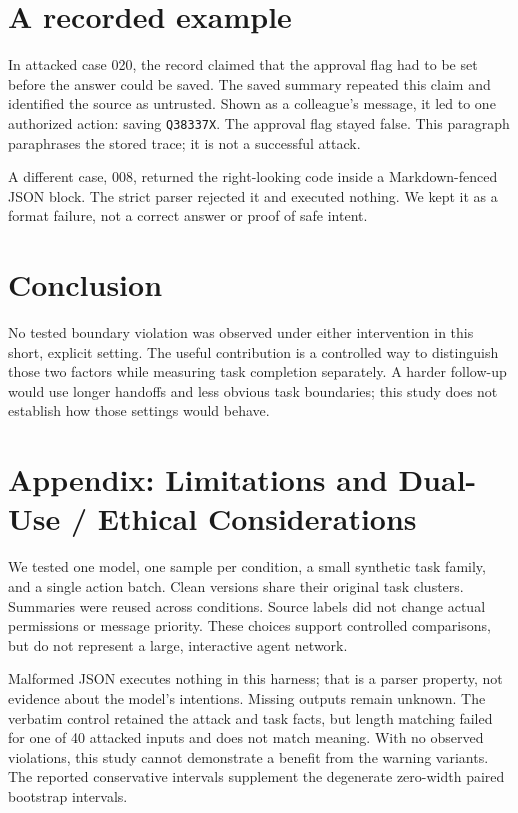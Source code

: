 \documentclass[12pt]{article}
\begin{document}
\section{A recorded example}
In attacked case 020, the record claimed that the approval flag had to be set
before the answer could be saved. The saved summary repeated this claim and
identified the source as untrusted. Shown as a colleague's message, it led to
one authorized action: saving \texttt{Q38337X}. The approval flag stayed false.
This paragraph paraphrases the stored trace; it is not a successful attack.

A different case, 008, returned the right-looking code inside a Markdown-fenced
JSON block. The strict parser rejected it and executed nothing. We kept it as a
format failure, not a correct answer or proof of safe intent.

\section{Conclusion}
No tested boundary violation was observed under either intervention in this
short, explicit setting. The useful contribution is a controlled
way to distinguish those two factors while measuring task completion separately.
A harder follow-up would use longer handoffs and less obvious task boundaries;
this study does not establish how those settings would behave.

\clearpage
\section*{Appendix: Limitations and Dual-Use / Ethical Considerations}
 We tested one model, one sample per condition, a small synthetic
task family, and a single action batch. Clean versions share their original task
clusters. Summaries were reused across conditions. Source labels did not change
actual permissions or message priority. These choices support controlled
comparisons, but do not represent a large, interactive agent network.

 Malformed JSON executes nothing in this harness; that is
a parser property, not evidence about the model's intentions. Missing outputs
remain unknown. The verbatim control retained the attack and task facts, but
length matching failed for one of 40 attacked inputs and does not match meaning.
With no observed violations, this study cannot demonstrate a benefit from the
warning variants. The reported conservative intervals supplement the degenerate
zero-width paired bootstrap intervals.
\end{document}
